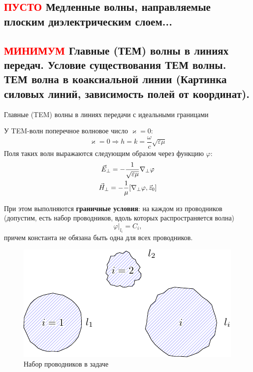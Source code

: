 \subsection{\textcolor{red}{ПУСТО} Медленные волны, направляемые плоским диэлектрическим слоем...}


\subsection{\textcolor{red}{МИНИМУМ} Главные (ТЕМ) волны в линиях передач. Условие существования ТЕМ волны. ТЕМ волна в коаксиальной линии
(Картинка силовых линий, зависимость полей от координат).}
Главные (TEM) волны в линиях передачи с идеальными границами

У TEM-волн поперечное волновое число $\varkappa=0$:
\begin{equation*}
\varkappa=0 \Rightarrow h=k= \frac{\omega}{c}\sqrt{\varepsilon \mu}
\end{equation*}
Поля таких волн выражаются следующим образом через функцию $\varphi$:
\begin{gather*}
\label{eperp}
\vec{E}_\perp=-\frac{1}{\sqrt{\varepsilon \mu}}\nabla_\perp \varphi\\
\vec{H}_\perp=-\frac{1}{\mu}\qty[\nabla_\perp \varphi,\vec{z}_0]
\end{gather*}

При этом выполняются \textbf{граничные условия}: на каждом из проводников (допустим, есть набор проводников, вдоль которых распространяется волна)
\begin{equation*}
\varphi|_{l_i}=C_i,
\end{equation*}
причем константа не обязана быть одна для всех проводников.

\begin{figure}[h!]
	\centering
	\includegraphics[scale=1]{img/lect4_ris1}
	\caption{Набор проводников в задаче}
	\label{fig:lect4:1}
\end{figure}

